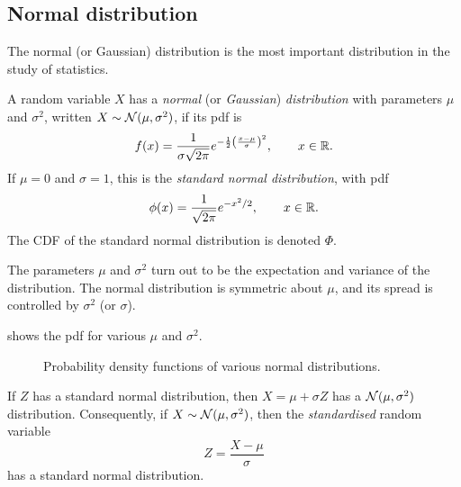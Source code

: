 \subsection{Normal distribution}\label{sec:normal}

The normal (or Gaussian) distribution is the most important distribution in the study of statistics.

\begin{definition}\label{def:normal}
A random variable $X$ has a \emph{normal} (or \emph{Gaussian}) \emph{distribution} with parameters $\mu$ and $\sigma^2$, written $X \sim \mathcal{N}(\mu, \sigma^2)$, if its pdf is
\[
  f(x) = \frac{1}{\sigma\sqrt{2\pi}} e^{-\frac12 \left(\frac{x - \mu}{\sigma}\right)^2}, \qquad x \in \mathbb{R}.
\]
If $\mu = 0$ and $\sigma = 1$, this is the \emph{standard normal distribution}, with pdf
\[
  \phi(x) = \frac{1}{\sqrt{2\pi}} e^{-x^2/2}, \qquad x \in \mathbb{R}.
\]
The CDF of the standard normal distribution is denoted $\Phi$.
\end{definition}

The parameters $\mu$ and $\sigma^2$ turn out to be the expectation and variance of the distribution. The normal distribution is symmetric about $\mu$, and its spread is controlled by $\sigma^2$ (or $\sigma$).

 shows the pdf for various $\mu$ and $\sigma^2$.

\begin{figure}[H]
\centering
{}
\caption{Probability density functions of various normal distributions.}
\label{fig:normal-pdfs}
\end{figure}


\begin{theorem}[Standardisation]\label{thm:standardisation}
If $Z$ has a standard normal distribution, then $X = \mu + \sigma Z$ has a $\mathcal{N}(\mu, \sigma^2)$ distribution. Consequently, if $X \sim \mathcal{N}(\mu, \sigma^2)$, then the \emph{standardised} random variable
\[
  Z = \frac{X - \mu}{\sigma}
\]
has a standard normal distribution.
\end{theorem}


